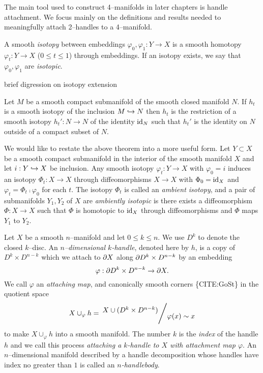 The main tool used to construct 4--manifolds in later chapters is handle attachment.
We focus mainly on the definitions and results needed to meaningfully attach 2--handles to a 4--manifold.

\begin{defn}
	\label{def:isotopy}
	
	A smooth \emph{isotopy} between embeddings $\varphi_0,\varphi_1:Y\to X$ is a smooth homotopy $\varphi_t: Y \to X$ ($0\leq t\leq 1$) through embeddings.
	If an isotopy exists, we say that $\varphi_0,\varphi_1$ are \emph{isotopic}.
	
\end{defn}

brief digression on isotopy extension

\begin{theorem}
	\label{thm:isotopyextension}
	
	Let $M$ be a smooth compact submanifold of the smooth closed manifold $N$.
	If $h_t$ is a smooth isotopy of the inclusion $M\hookrightarrow N$ then $h_t$ is the restriction of a smooth isotopy $h_t':N\to N$ of the identity $\textrm{id}_{N}$ such that $h_t'$ is the identity on $N$ outside of a compact subset of $N$.
	
\end{theorem}

We would like to restate the above theorem into a more useful form.
Let $Y\subset X$ be a smooth compact submanifold in the interior of the smooth manifold $X$ and let $i:Y\hookrightarrow X$ be inclusion.
Any smooth isotopy $\varphi_t:Y\to X$ with $\varphi_0=i$ induces an isotopy $\Phi_t:X\to X$ through diffeomorphisms $X\to X$ with $\Phi_0=\textrm{id}_{X}$ and $\varphi_t=\Phi_t\comp\varphi_0$ for each $t$.
The isotopy $\Phi_t$ is called an \emph{ambient isotopy}, and a pair of submanifolds $Y_1,Y_2$ of $X$ are \emph{ambiently isotopic} is there exists a diffeomorphism $\Phi:X\to X$ such that $\Phi$ is homotopic to $\textrm{id}_{X}$ through diffeomorphisms and $\Phi$ maps $Y_1$ to $Y_2$.

\begin{defn}
\label{def:handle}
Let $X$ be a smooth $n$--manifold and let $0\leq k\leq n$.
We use $D^k$ to denote the closed $k$--disc.
An \emph{$n$--dimensional $k$-handle}, denoted here by $h$, is a copy of $D^k\times D^{n-k}$ which we attach to $\partial X$ along $\partial D^k\times D^{n-k}$ by an embedding
\[
  \varphi : \partial D^k \times D^{n-k} \to \partial X.
\]
We call $\varphi$ an \emph{attaching map}, and canonically smooth corners \{CITE:GoSt\} in the quotient space
\[
  X\cup_\varphi h = \quotient{X \cup ( D^k\times D^{n-k} ) }{ \varphi(x) \sim x }
\]
to make $X\cup_\varphi h$ into a smooth manifold.
The number $k$ is the \emph{index} of the handle $h$ and we call this process \emph{attaching a $k$-handle to $X$ with attachment map $\varphi$}.
An $n$--dimensional manifold described by a handle decomposition whose handles have index no greater than $1$ is called an \emph{$n$-handlebody}.
\end{defn}


